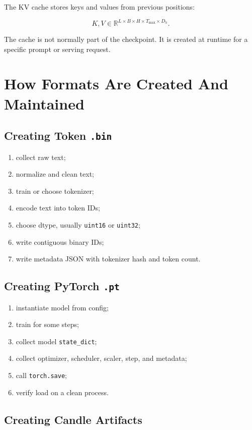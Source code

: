 The KV cache stores keys and values from previous positions:

\[
K,V \in \mathbb{R}^{L \times B \times H \times T_{\max} \times D_h}.
\]

The cache is not normally part of the checkpoint. It is created at runtime for a specific
prompt or serving request.

\section{How Formats Are Created And Maintained}

\subsection{Creating Token \texttt{.bin}}

\begin{enumerate}
  \item collect raw text;
  \item normalize and clean text;
  \item train or choose tokenizer;
  \item encode text into token IDs;
  \item choose dtype, usually \texttt{uint16} or \texttt{uint32};
  \item write contiguous binary IDs;
  \item write metadata JSON with tokenizer hash and token count.
\end{enumerate}

\subsection{Creating PyTorch \texttt{.pt}}

\begin{enumerate}
  \item instantiate model from config;
  \item train for some steps;
  \item collect model \texttt{state\_dict};
  \item collect optimizer, scheduler, scaler, step, and metadata;
  \item call \texttt{torch.save};
  \item verify load on a clean process.
\end{enumerate}

\subsection{Creating Candle Artifacts}

